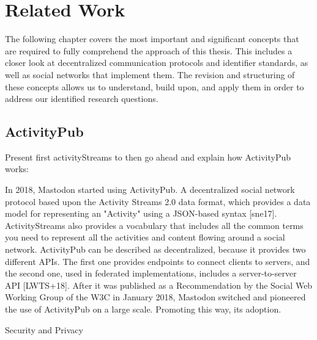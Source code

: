\chapter{Related Work}
\label{cha:relatedwork}


The following chapter covers the most important and significant concepts that are required to fully comprehend the approach of this thesis. This includes a closer look at decentralized  communication protocols and identifier standards, as well as social networks that implement them. The revision and structuring of these concepts allows us to understand, build upon, and apply them in order to address our identified research questions. 

\section{ActivityPub}
Present first activityStreams to then go ahead and explain how ActivityPub works:

In 2018, Mastodon started using ActivityPub. A decentralized social network protocol based upon the Activity Streams 2.0 data format, which provides a data model for representing an "Activity" using a JSON-based syntax [sne17]. ActivityStreams also provides a vocabulary that includes all the common terms you need to represent all the activities and content flowing around a social network. ActivityPub can be described as decentralized, because it provides two different APIs. The first one provides endpoints to connect clients to servers, and the second one, used in federated implementations, includes a server-to-server API [LWTS+18]. After it was published as a Recommendation by the Social Web Working Group of the W3C in January 2018, Mastodon switched and pioneered the use of ActivityPub on a large scale. Promoting this way, its adoption.

Security and Privacy

